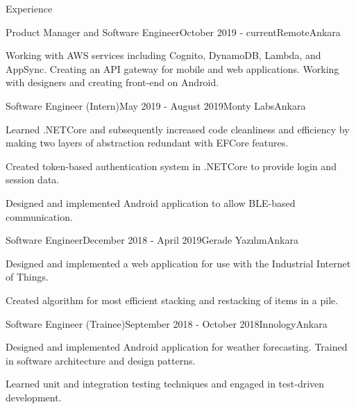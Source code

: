 \documentclass{resume} %
\begin{document}
\begin{rSection}{Experience}

    
    
    \begin{rSubsection}{Product Manager and Software Engineer}{October 2019 - current}{Remote}{Ankara}
        \item Working with AWS services including Cognito, DynamoDB, Lambda, and AppSync. Creating an API gateway for mobile and web applications. Working with designers and creating front-end on Android.
    \end{rSubsection}
    
    \begin{rSubsection}{Software Engineer (Intern)}{May 2019 - August 2019}{Monty Labs}{Ankara}
        \item Learned .NETCore and subsequently increased code cleanliness and efficiency by making two layers of abstraction redundant with EFCore features.
        
        \item Created token-based authentication system in .NETCore to provide login and session data.
        
        \item Designed and implemented Android application to allow BLE-based communication.
    \end{rSubsection}
    
    \begin{rSubsection}{Software Engineer}{December 2018 - April 2019}{Gerade Yazılım}{Ankara}
        \item Designed and implemented a web application for use with the Industrial Internet of Things.
        \item Created algorithm for most efficient stacking and restacking of items in a pile.
    \end{rSubsection}
    
    \begin{rSubsection}{Software Engineer (Trainee)}{September 2018 - October 2018}{Innology}{Ankara}
        \item Designed and implemented Android application for weather forecasting. Trained in software architecture and design patterns.
    
        \item Learned unit and integration testing techniques and engaged in test-driven development.
    \end{rSubsection}
    
\end{rSection}
\end{document}
